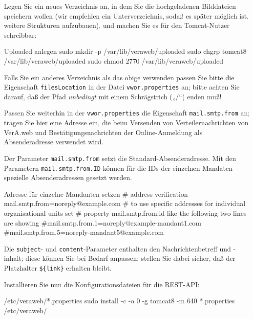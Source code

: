 \begin{minipage}{\linewidth}
Legen Sie ein neues Verzeichnis an, in dem Sie die hochgeladenen
Bilddateien speichern wollen (wir empfehlen ein Unterverzeichnis,
sodaß es später möglich ist, weitere Strukturen aufzubauen), und
machen Sie es für den Tomcat-Nutzer schreibbar:

\begin{lstdump}{Uploaded anlegen}
sudo mkdir -p /var/lib/veraweb/uploaded
sudo chgrp tomcat8 /var/lib/veraweb/uploaded
sudo chmod 2770 /var/lib/veraweb/uploaded
\end{lstdump}

Falls Sie ein anderes Verzeichnis als das obige verwenden passen
Sie bitte die Eigenschaft \texttt{filesLocation} in der Datei
\texttt{vwor.properties} an; bitte achten Sie darauf, daß der
Pfad \emph{unbedingt} mit einem Schrägstrich („/“) enden muß!
\end{minipage}

\begin{minipage}{\linewidth}
Passen Sie weiterhin in der \texttt{vwor.properties} die Eigenschaft
\texttt{mail.smtp.from} an; tragen Sie hier eine Adresse ein, die beim
Versenden von Verteilernachrichten von VerA.web und Bestätigungsnachrichten der Online-Anmeldung
als Absenderadresse verwendet wird.

Der Parameter \texttt{mail.smtp.from} setzt die Standard-Absenderadresse.
Mit den Parametern \texttt{mail.smtp.from.ID} können für die IDs der einzelnen
Mandaten spezielle Absenderadressen gesetzt werden.

\begin{lstdump}{Adresse für einzelne Mandanten setzen}
# address verification
mail.smtp.from=noreply@example.com
# to use specific addresses for individual organisational units set
# property mail.smtp.from.{id} like the following two lines are showing
#mail.smtp.from.1=noreply@example-mandant1.com
#mail.smtp.from.5=noreply-mandant5@example.com
\end{lstdump}

\ifoa

Die \texttt{subject}- und
\texttt{content}-Parameter enthalten den Nachrichtenbetreff und
-inhalt; diese können Sie bei Bedarf anpassen; stellen Sie dabei
sicher, daß der Platzhalter \texttt{\$\{link\}} erhalten bleibt.

\fi%

\end{minipage}

\begin{minipage}{\linewidth}
Installieren Sie nun die Konfigurationsdateien für die REST-API:

\begin{lstdump}{/etc/veraweb/*.properties}
sudo install -c -o 0 -g tomcat8 -m 640 *.properties /etc/veraweb/
\end{lstdump}
\end{minipage}

